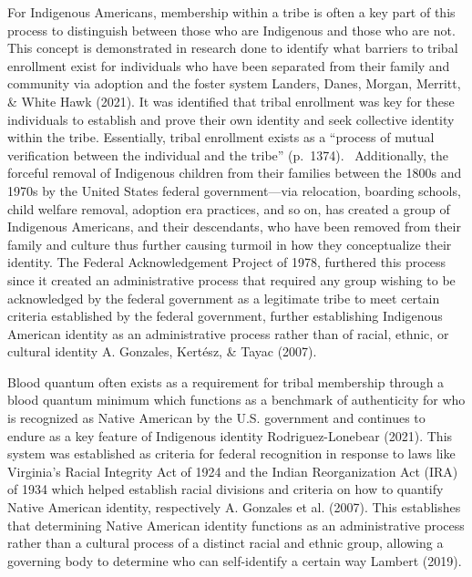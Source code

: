 \documentclass[
  12pt,
  letterpaper,
]{article}
\begin{document}
For Indigenous Americans, membership within a tribe is often a key part
of this process to distinguish between those who are Indigenous and
those who are not. This concept is demonstrated in research done to
identify what barriers to tribal enrollment exist for individuals who
have been separated from their family and community via adoption and the
foster system Landers, Danes, Morgan, Merritt, \& White Hawk (2021). It
was identified that tribal enrollment was key for these individuals to
establish and prove their own identity and seek collective identity
within the tribe. Essentially, tribal enrollment exists as a ``process
of mutual verification between the individual and the tribe''
(p.~1374).~ Additionally, the forceful removal of Indigenous children
from their families between the 1800s and 1970s by the United States
federal government---via relocation, boarding schools, child welfare
removal, adoption era practices, and so on, has created a group of
Indigenous Americans, and their descendants, who have been removed from
their family and culture thus further causing turmoil in how they
conceptualize their identity. The Federal Acknowledgement Project of
1978, furthered this process since it created an administrative process
that required any group wishing to be acknowledged by the federal
government as a legitimate tribe to meet certain criteria established by
the federal government, further establishing Indigenous American
identity as an administrative process rather than of racial, ethnic, or
cultural identity A. Gonzales, Kertész, \& Tayac (2007).

Blood quantum often exists as a requirement for tribal membership
through a blood quantum minimum which functions as a benchmark of
authenticity for who is recognized as Native American by the U.S.
government and continues to endure as a key feature of Indigenous
identity Rodriguez-Lonebear (2021). This system was established as
criteria for federal recognition in response to laws like Virginia's
Racial Integrity Act of 1924 and the Indian Reorganization Act (IRA) of
1934 which helped establish racial divisions and criteria on how to
quantify Native American identity, respectively A. Gonzales et al.
(2007). This establishes that determining Native American identity
functions as an administrative process rather than a cultural process of
a distinct racial and ethnic group, allowing a governing body to
determine who can self-identify a certain way Lambert (2019).
\end{document}
